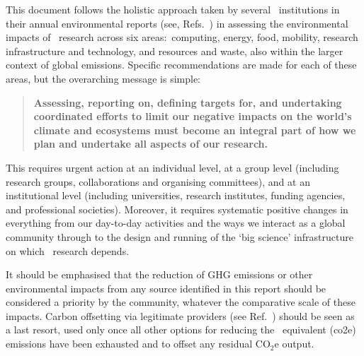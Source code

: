 \documentclass[../SustainableHEP.tex]{subfiles}
\begin{document}
This document follows the holistic approach taken by several \ACR\ institutions in their annual environmental reports (see, \eg Refs.~\cite{Environment:2737239,FermilabEnvReport2019}) in assessing the environmental impacts of \ACR\ research across six areas:\ computing, energy, food, mobility, research infrastructure and technology, and resources and waste, also within the larger context of global emissions. Specific recommendations are made for each of these areas, but the overarching message is simple:
\begin{quotation}
{\bfseries Assessing, reporting on, defining targets for, and undertaking coordinated efforts to limit our negative impacts on the world's climate and ecosystems must become an integral part of how we plan and undertake all aspects of our research.}
\end{quotation}
This requires urgent action at an individual level, at a group level (including research groups, collaborations and organising committees), and at an institutional level (including universities, research institutes, funding agencies, and professional societies). Moreover, it requires systematic positive changes in everything from our day-to-day activities and the ways we interact as a global community through to the design and running of the `big science' infrastructure on which \ACR\ research depends.

It should be emphasised that the reduction of GHG emissions or other environmental impacts from any source identified in this report should be considered a priority by the community, whatever the comparative scale of these impacts. Carbon offsetting via legitimate providers (see Ref.~\cite{Uni22}) should be seen as a last resort, used only once all other options for reducing the \CdO\ equivalent (\acrshort{co2e}) emissions have been exhausted and to offset any residual CO$_2$e output.
\end{document}
